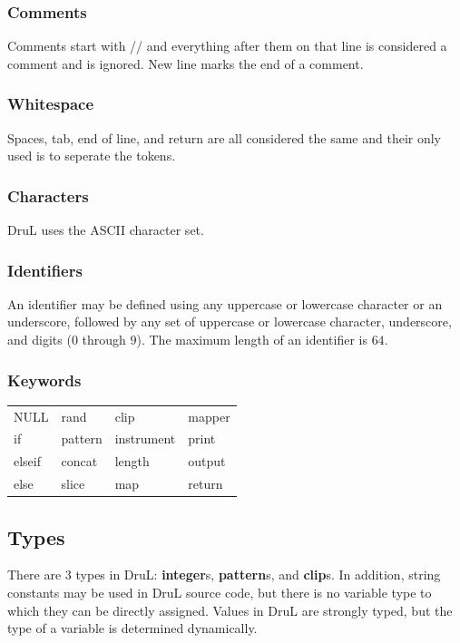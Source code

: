 \documentclass[11pt,twoside]{article}
\begin{document}
\subsubsection{Comments}
Comments start with // and everything after them on that line
is considered a comment and is ignored. New line marks the end
of a comment.
\subsubsection{Whitespace}
Spaces, tab, end of line, and return are all considered the same 
and their only used is to seperate the tokens.

\subsubsection{Characters}
DruL uses the ASCII character set.

\subsubsection{Identifiers}
An identifier may be defined using any uppercase or lowercase character
or an underscore, followed by any set of uppercase or lowercase character,
underscore, and digits ($0$ through $9$). The maximum length of an identifier
is $64$.

\subsubsection{Keywords}


\begin{table}[htb]
\begin{center} 
\begin{tabular}{llll} 
  NULL &    rand &    clip &        mapper \\
  if &      pattern & instrument &  print \\
  elseif &  concat &  length &      output \\
  else &    slice &   map &         return
\end{tabular}
\label{tab:keywords}
\end{center} 
\end{table}


\subsection{Types}

There are $3$ types in DruL: \textbf{integer}s, \textbf{pattern}s,
and \textbf{clip}s.  In addition, string constants may be used in DruL source code, but there is no variable type to which they can be directly assigned.
Values in DruL are strongly typed, but the type of a variable is determined dynamically.
\end{document}
